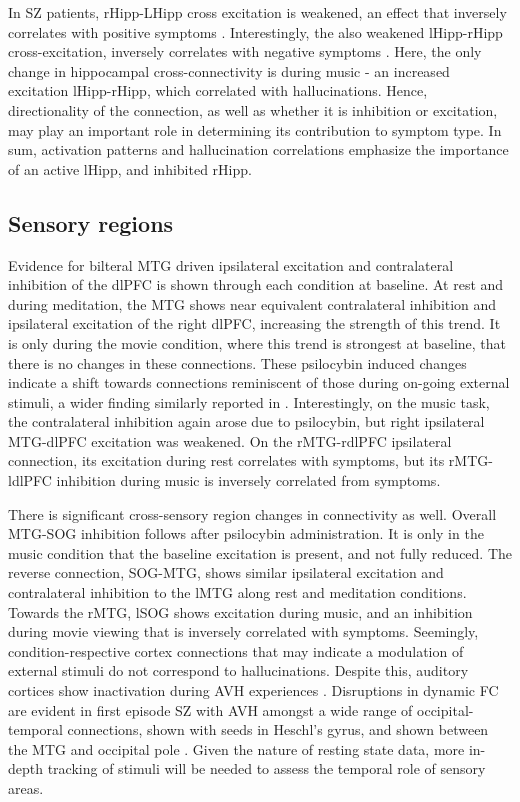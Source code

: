 \documentclass{article}
\begin{document}
In SZ patients, rHipp-LHipp cross excitation is weakened, an effect that inversely correlates with positive symptoms \citep{uscatescu_effective_2021}. Interestingly, the also weakened lHipp-rHipp cross-excitation, inversely correlates with negative symptoms \citep{uscatescu_effective_2021}. Here, the only change in hippocampal cross-connectivity is during music - an increased excitation lHipp-rHipp, which correlated with hallucinations. Hence, directionality of the connection, as well as whether it is inhibition or excitation, may play an important role in determining its contribution to symptom type. In sum, activation patterns and hallucination correlations emphasize the importance of an active lHipp, and inhibited rHipp.    
\subsection{Sensory regions}

Evidence for bilteral MTG driven ipsilateral excitation and contralateral inhibition of the dlPFC is shown through each condition at baseline. At rest and during meditation, the MTG shows near equivalent contralateral inhibition and ipsilateral excitation of the right dlPFC, increasing the strength of this trend. It is only during the movie condition, where this trend is strongest at baseline, that there is no changes in these connections. These psilocybin induced changes indicate a shift towards connections reminiscent of those during on-going external stimuli, a wider finding similarly reported in \citep{stoliker_neural_2025}. Interestingly, on the music task, the contralateral inhibition again arose due to psilocybin, but right ipsilateral MTG-dlPFC excitation was weakened. On the rMTG-rdlPFC ipsilateral connection, its excitation during rest correlates with symptoms, but its rMTG-ldlPFC inhibition during music is inversely correlated from symptoms. 

There is significant cross-sensory region changes in connectivity as well. Overall MTG-SOG inhibition follows after psilocybin administration. It is only in the music condition that the baseline excitation is present, and not fully reduced. The reverse connection, SOG-MTG, shows similar ipsilateral excitation and contralateral inhibition to the lMTG along rest and meditation conditions. Towards the rMTG, lSOG shows excitation during music, and an inhibition during movie viewing that is inversely correlated with symptoms. Seemingly, condition-respective cortex connections that may indicate a modulation of external stimuli do not correspond to hallucinations. Despite this, auditory cortices show inactivation during AVH experiences \citep{fuentes-claramonte2021auditory}.  Disruptions in dynamic FC are evident in first episode SZ with AVH amongst a wide range of occipital-temporal connections, shown with seeds in Heschl's gyrus, and shown between the MTG and occipital pole \citep{xue_altered_2022, zaykova_lateralized_2025}. Given the nature of resting state data, more in-depth tracking of stimuli will be needed to assess the temporal role of sensory areas.
\end{document}
